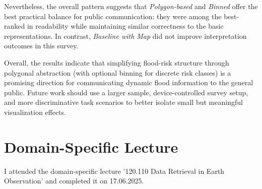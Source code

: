 \documentclass[11pt, a4paper]{article}
\begin{document}
Nevertheless, the overall pattern suggests that \emph{Polygon-based} and \emph{Binned} offer the best practical balance for public communication: they were among the best-ranked in readability while maintaining similar correctness to the basic representations. In contrast, \emph{Baseline with Map} did not improve interpretation outcomes in this survey.

Overall, the results indicate that simplifying flood-risk structure through polygonal abstraction (with optional binning for discrete risk classes) is a promising direction for communicating dynamic flood information to the general public. Future work should use a larger sample, device-controlled survey setup, and more discriminative task scenarios to better isolate small but meaningful visualization effects.

\section{Domain-Specific Lecture}
\label{sec:domain_specific_lecture}
I attended the domain-specific lecture ’120.110 Data Retrieval in Earth Observation’
and completed it on 17.06.2025.
\end{document}
